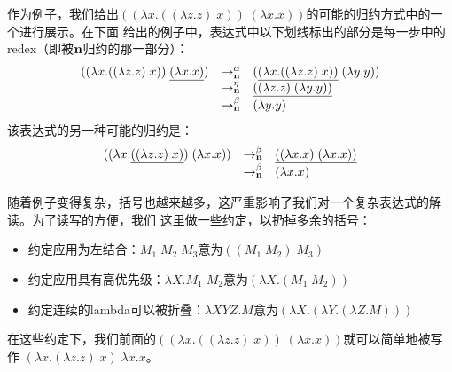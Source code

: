 \documentclass[12pt]{article}
\begin{document}
\indent{}作为例子，我们给出$((\lambda x.((\lambda z.z)\;x))\;(\lambda x.x))$的可能的归约方式中的一个进行展示。在下面
给出的例子中，表达式中以下划线标出的部分是每一步中的redex（即被$\bf{n}$归约的那一部分）：
\begin{gather*}
\begin{array}{lll}
((\lambda x.((\lambda z.z)\;x))\;\underline{(\lambda x.x)})
& \rightarrow_{\bf{n}}^{\alpha} & (\underline{(\lambda x.((\lambda z.z)\;x))}\;(\lambda y.y))\\
& \rightarrow_{\bf{n}}^{\eta}   & \underline{((\lambda z.z)\;(\lambda y.y))}\\
& \rightarrow_{\bf{n}}^{\beta}  & (\lambda y.y)
\end{array}
\end{gather*}
\noindent{}该表达式的另一种可能的归约是：
\begin{gather*}
\begin{array}{lll}
((\lambda x.\underline{((\lambda z.z)\;x)})\;(\lambda x.x))
& \rightarrow_{\bf{n}}^{\beta} & \underline{((\lambda x.x)\;(\lambda x.x))}\\
& \rightarrow_{\bf{n}}^{\beta} & (\lambda x.x)
\end{array}
\end{gather*}

\indent{}随着例子变得复杂，括号也越来越多，这严重影响了我们对一个复杂表达式的解读。为了读写的方便，我们
这里做一些约定，以扔掉多余的括号：
\begin{itemize}
\item 约定应用为左结合：$M_1\;M_2\;M_3$意为$((M_1\;M_2)\;M_3)$
\item 约定应用具有高优先级：$\lambda X.M_1\;M_2$意为$(\lambda X.(M_1\;M_2))$
\item 约定连续的lambda可以被折叠：$\lambda XYZ.M$意为$(\lambda X.(\lambda Y.(\lambda Z.M)))$
\end{itemize}
\noindent{}在这些约定下，我们前面的$((\lambda x.((\lambda z.z)\;x))\;(\lambda x.x))$就可以简单地被写作
$(\lambda x.(\lambda z.z)\;x)\; \lambda x.x$。
\clearpage
\end{document}
